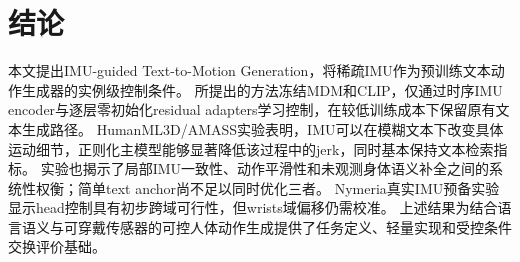 \section{结论}
\label{sec:6_conclusion}


本文提出IMU-guided Text-to-Motion Generation，将稀疏IMU作为预训练文本动作生成器的实例级控制条件。
所提出的方法冻结MDM和CLIP，仅通过时序IMU encoder与逐层零初始化residual adapters学习控制，在较低训练成本下保留原有文本生成路径。
HumanML3D/AMASS实验表明，IMU可以在模糊文本下改变具体运动细节，正则化主模型能够显著降低该过程中的jerk，同时基本保持文本检索指标。
实验也揭示了局部IMU一致性、动作平滑性和未观测身体语义补全之间的系统性权衡；简单text anchor尚不足以同时优化三者。
Nymeria真实IMU预备实验显示head控制具有初步跨域可行性，但wrists域偏移仍需校准。
上述结果为结合语言语义与可穿戴传感器的可控人体动作生成提供了任务定义、轻量实现和受控条件交换评价基础。
